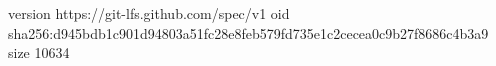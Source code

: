 version https://git-lfs.github.com/spec/v1
oid sha256:d945bdb1c901d94803a51fc28e8feb579fd735e1c2cecea0c9b27f8686c4b3a9
size 10634
